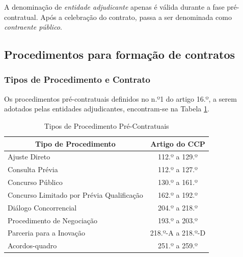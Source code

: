 A denominação  de \textit{entidade adjudicante} apenas é válida durante a fase pré-contratual. Após a celebração do contrato, passa a ser denominada como \textit{contraente público}. 



\subsection{Procedimentos para formação de contratos}

\subsubsection{Tipos de Procedimento e Contrato}
Os procedimentos pré-contratuais definidos no n.º1 do artigo 16.º, a serem adotados pelas entidades adjudicantes, encontram-se na Tabela \ref{table:2}.

\begin{table}[ht]
	\centering
	\renewcommand{\arraystretch}{1.15}
	\setlength{\tabcolsep}{15pt}
		\begin{tabular}{lc}
			\toprule
			\multicolumn{1}{c}{\textbf{Tipo de Procedimento}} & \textbf{Artigo do CCP} \\ 
			\midrule
			\rowcolor[HTML]{EFEFEF} 
			Ajuste Direto                                     & 112.º a 129.º          \\ 
			Consulta Prévia                                   & 112.º a 127.º          \\
			\rowcolor[HTML]{EFEFEF} 
			Concurso Público                                  & 130.º a 161.º          \\
			Concurso Limitado por Prévia Qualificação         & 162.º a 192.º          \\
			\rowcolor[HTML]{EFEFEF} 
			Diálogo Concorrencial                             & 204.º a 218.º          \\
			Procedimento de Negociação                        & 193.º a 203.º          \\
			\rowcolor[HTML]{EFEFEF} 
			Parceria para a Inovação                          & 218.º-A a 218.º-D      \\
			Acordos-quadro                                    & 251.º a 259.º          \\                             
			\bottomrule
		\end{tabular}
	\caption{Tipos de Procedimento Pré-Contratuais}
	\label{table:2}
\end{table}


